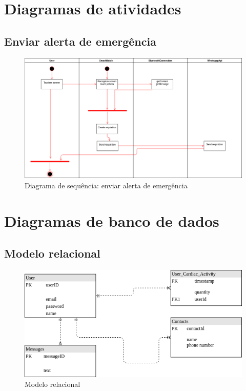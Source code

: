 \documentclass[
	12pt,				%
	openright,			%
	oneside,			%
	a4paper,			%
	english,			%
	french,				%
	spanish,			%
	brazil				%
]{abntex2}
\begin{document}
\chapter{Diagramas de atividades}
\section{Enviar alerta de emergência}	
\begin{figure}[h]	
	\label{figure_diagrama_sequencia_enviar_alerta_emergencia}
	\includegraphics[scale=0.4]{ActivityDiagrams/Send_Message.png}
	\caption{ Diagrama de sequência: enviar alerta de emergência }
	\hfill
\end{figure}
%
\chapter{Diagramas de banco de dados}
\section{Modelo relacional}
\begin{figure}[h]	
	\label{figure_relational_database}	
	\includegraphics[scale=0.6]{Database/database.png}
	\caption{ Modelo relacional }
	\hfill
\end{figure}
%
\end{document}
